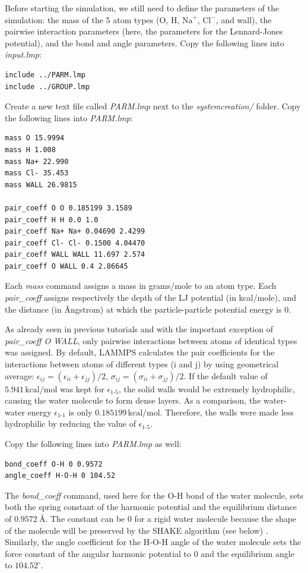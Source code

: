\documentclass[9pt,tutorial]{livecoms}
\begin{document}
Before starting the simulation, we still need to define the parameters of the
simulation: the mass of the 5 atom types (O, H, $\text{Na}^+$, $\text{Cl}^-$,
and wall), the pairwise interaction parameters (here, the parameters for the
Lennard-Jones potential), and the bond and angle parameters. Copy the following
lines into \textit{input.lmp}:
\begin{lstlisting}
include ../PARM.lmp
include ../GROUP.lmp
\end{lstlisting}
Create a new text file called \textit{PARM.lmp} next to the \textit{systemcreation/}
folder. Copy the following lines into \textit{PARM.lmp}:
\begin{lstlisting}
mass O 15.9994
mass H 1.008
mass Na+ 22.990
mass Cl- 35.453
mass WALL 26.9815

pair_coeff O O 0.185199 3.1589
pair_coeff H H 0.0 1.0
pair_coeff Na+ Na+ 0.04690 2.4299
pair_coeff Cl- Cl- 0.1500 4.04470
pair_coeff WALL WALL 11.697 2.574
pair_coeff O WALL 0.4 2.86645
\end{lstlisting}
Each \textit{mass} command assigns a mass in grams/mole to an atom type.
Each \textit{pair\_coeff} assigns respectively the depth of the LJ potential
(in kcal/mole), and the distance (in Ångstrom) at which the particle-particle
potential energy is 0.

As already seen in previous tutorials and with the important exception of
\textit{pair\_coeff O WALL}, only pairwise interactions between atoms of identical
types was assigned. By default, LAMMPS calculates the pair coefficients for the
interactions between atoms of different types (i and j) by using geometrical average:
$\epsilon_{ij} = (\epsilon_{ii} + \epsilon_{jj})/2$,  $\sigma_{ij} = (\sigma_{ii} + \sigma_{jj})/2$.
If the default value of $5.941\,\text{kcal/mol}$ was kept for $\epsilon_\text{1-5}$, the solid
walls would be extremely hydrophilic, causing the water molecule to form dense layers. As a
comparison, the water-water energy $\epsilon_\text{1-1}$ is only $0.185199\,\text{kcal/mol}$.
Therefore, the walls were made less hydrophilic by reducing the value of $\epsilon_\text{1-5}$.

Copy the following lines into \textit{PARM.lmp} as well:
\begin{lstlisting}
bond_coeff O-H 0 0.9572
angle_coeff H-O-H 0 104.52
\end{lstlisting}
The \textit{bond\_coeff} command, used here for the O-H bond of the water
molecule, sets both the spring constant of the harmonic potential and the
equilibrium distance of $0.9572~\text{\AA{}}$. The constant can be 0 for a
rigid water molecule because the shape of the molecule will be preserved by
the SHAKE algorithm (see below) \cite{ryckaert1977numerical, andersen1983rattle}.
Similarly, the angle coefficient for the H-O-H angle of the water molecule sets
the force constant of the angular harmonic potential to 0 and the equilibrium
angle to $104.52^\circ$.
\end{document}
